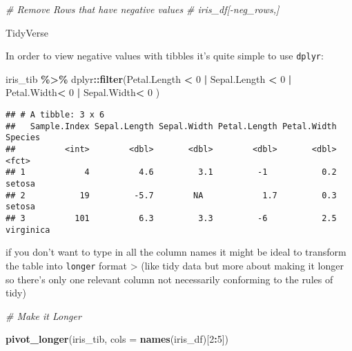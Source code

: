 \documentclass[
]{article}
\newenvironment{Shaded}{\begin{snugshade}}{\end{snugshade}}
\newcommand{\CommentTok}[1]{\textcolor[rgb]{0.56,0.35,0.01}{\textit{#1}}}
\newcommand{\DataTypeTok}[1]{\textcolor[rgb]{0.13,0.29,0.53}{#1}}
\newcommand{\DecValTok}[1]{\textcolor[rgb]{0.00,0.00,0.81}{#1}}
\newcommand{\KeywordTok}[1]{\textcolor[rgb]{0.13,0.29,0.53}{\textbf{#1}}}
\newcommand{\NormalTok}[1]{#1}
\newcommand{\OperatorTok}[1]{\textcolor[rgb]{0.81,0.36,0.00}{\textbf{#1}}}
\newcommand{\StringTok}[1]{\textcolor[rgb]{0.31,0.60,0.02}{#1}}
\begin{document}
\begin{Shaded}
\begin{Highlighting}[]
\CommentTok{\# Remove Rows that have negative values}
\CommentTok{\# iris\_df[{-}neg\_rows,]}
\end{Highlighting}
\end{Shaded}

TidyVerse

In order to view negative values with tibbles it's quite simple to use
\texttt{dplyr}:

\begin{Shaded}
\begin{Highlighting}[]
\NormalTok{iris\_tib }\OperatorTok{\%>\%}
\StringTok{  }\NormalTok{dplyr}\OperatorTok{::}\KeywordTok{filter}\NormalTok{(Petal.Length }\OperatorTok{<}\StringTok{ }\DecValTok{0} \OperatorTok{|}\StringTok{  }\NormalTok{Sepal.Length }\OperatorTok{<}\StringTok{ }\DecValTok{0} \OperatorTok{|}\StringTok{  }\NormalTok{Petal.Width}\OperatorTok{<}\StringTok{ }\DecValTok{0} \OperatorTok{|}\StringTok{  }\NormalTok{Sepal.Width}\OperatorTok{<}\StringTok{ }\DecValTok{0}\NormalTok{ )}
\end{Highlighting}
\end{Shaded}

\begin{verbatim}
## # A tibble: 3 x 6
##   Sample.Index Sepal.Length Sepal.Width Petal.Length Petal.Width Species  
##          <int>        <dbl>       <dbl>        <dbl>       <dbl> <fct>    
## 1            4          4.6         3.1         -1           0.2 setosa   
## 2           19         -5.7        NA            1.7         0.3 setosa   
## 3          101          6.3         3.3         -6           2.5 virginica
\end{verbatim}

if you don't want to type in all the column names it might be ideal to
transform the table into \texttt{longer} format \textgreater{} (like
tidy data but more about making it longer so there's only one relevant
column not necessarily conforming to the rules of tidy)

\begin{Shaded}
\begin{Highlighting}[]
\CommentTok{\# Make it Longer}

\KeywordTok{pivot\_longer}\NormalTok{(iris\_tib, }\DataTypeTok{cols =} \KeywordTok{names}\NormalTok{(iris\_df)[}\DecValTok{2}\OperatorTok{:}\DecValTok{5}\NormalTok{]) }
\end{Highlighting}
\end{Shaded}
\end{document}
